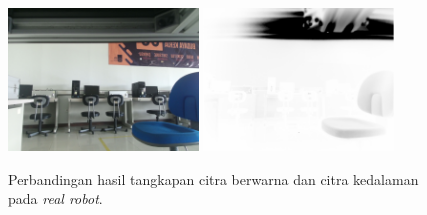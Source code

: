\begin{figure}[ht]
  \centering
  \includegraphics[width=0.45\textwidth,keepaspectratio]{gambar/citra-depth-camera-rgb-robot.png}
  \includegraphics[width=0.45\textwidth,keepaspectratio]{gambar/citra-depth-camera-depth-robot.png}
  \caption{Perbandingan hasil tangkapan citra berwarna dan citra kedalaman pada \emph{real robot}.}
  \label{fig:depthcamerarobot}
\end{figure}
